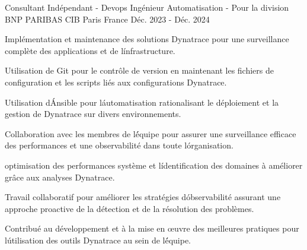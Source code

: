 

\begin{cventries}

  \cventry
    {Consultant Indépendant - Devops  Ingénieur Automatisation - }  %
    {Pour la division BNP PARIBAS CIB} %
    {Paris France} %
    {Déc. 2023 - Déc. 2024} %
    {
      \begin{cvitems} %
        \item {Implémentation et maintenance des solutions Dynatrace pour une surveillance complète des applications et de l\' infrastructure.}
        \item {Utilisation de Git pour le contrôle de version en maintenant les fichiers de configuration et les scripts liés aux configurations Dynatrace.}
        \item {Utilisation d\' Ansible pour l\' automatisation rationalisant le déploiement et la gestion de Dynatrace sur divers environnements.}
        \item {Collaboration avec les membres de l\' équipe pour assurer une surveillance efficace des performances et une observabilité dans toute l\' organisation.}
        \item {optimisation des performances système et l\' identification des domaines à améliorer grâce aux analyses Dynatrace.}
        \item {Travail collaboratif pour améliorer les stratégies d\' observabilité assurant une approche proactive de la détection et de la résolution des problèmes.}
        \item {Contribué au développement et à la mise en œuvre des meilleures pratiques pour l\' utilisation des outils Dynatrace au sein de l\' équipe.}
      \end{cvitems}
    }


\end{cventries}
